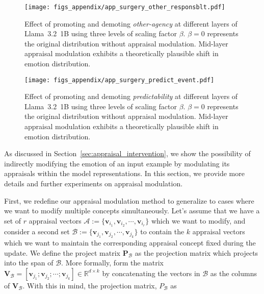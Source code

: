 \begin{figure*}[htbp]
    \centering
    \texttt{[image: figs\_appendix/app\_surgery\_other\_responsblt.pdf]}
  \caption{Effect of promoting and demoting \textit{other-agency} at different layers of Llama~3.2~1B using three levels of scaling factor $\beta$. $\beta = 0$ represents the original distribution without appraisal modulation. Mid-layer appraisal modulation exhibits a theoretically plausible shift in emotion distribution.}
  \label{fig:appraisal_layers_otheragency}
\end{figure*} 

\begin{figure*}[htbp]
    \centering
    \texttt{[image: figs\_appendix/app\_surgery\_predict\_event.pdf]}
  \caption{Effect of promoting and demoting \textit{predictability} at different layers of Llama~3.2~1B using three levels of scaling factor $\beta$. $\beta = 0$ represents the original distribution without appraisal modulation. Mid-layer appraisal modulation exhibits a theoretically plausible shift in emotion distribution.}
  \label{fig:appraisal_layers_predictability}
\end{figure*} 





As discussed in Section~\ref{sec:appraisal_intervention}, we show the possibility of indirectly modifying the emotion of an input example by modulating its appraisals within the model representations. In this section, we provide more details and further experiments on appraisal modulation.

First, we redefine our appraisal modulation method to generalize to cases where we want to modify multiple concepts simultaneously. Let's assume that we have a set of $r$ appraisal vectors $\mathcal{A} := \{\mathbf{v}_{i_1}, \mathbf{v}_{i_2}, \cdots, \mathbf{v}_{i_r}\}$ which we want to modify, and consider a second set $\mathcal{B} := \{\mathbf{v}_{j_1}, \mathbf{v}_{j_2}, \cdots, \mathbf{v}_{j_k} \}$ to contain the $k$ appraisal vectors which we want to maintain the corresponding appraisal concept fixed during the update. We define the project matrix $\mathbf{P}_{\mathcal{B}}$ as the projection matrix which projects into the span of $\mathcal{B}$. More formally, form the matrix $\mathbf{V}_{\mathcal{B}} = [\mathbf{v}_{j_1}; \mathbf{v}_{j_2}; \cdots; \mathbf{v}_{j_k}] \in \mathbb{R}^{d \times k}$ by concatenating the vectors in $\mathcal{B}$ as the columns of $\mathbf{V}_{\mathcal{B}}$. With this in mind, the projection matrix, $P_{\mathcal{B}}$ as

